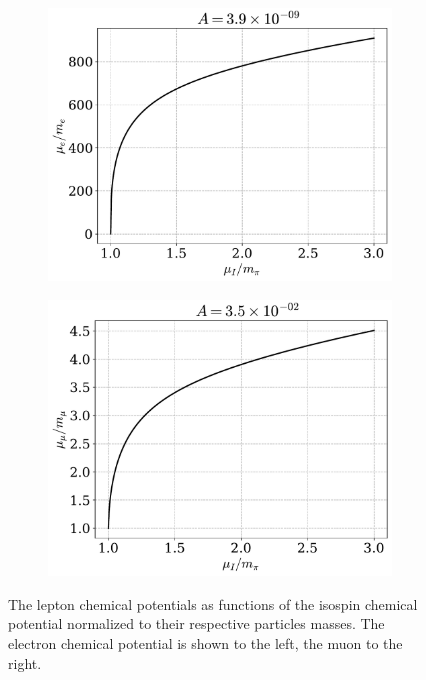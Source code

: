 \begin{figure}[!htb]
    \centering
    \begin{subfigure}{0.49 \textwidth}
        \includegraphics[width=\textwidth]{../scripts/figurer/charge_neutrality/chemical_potential_e.pdf}
    \end{subfigure}
    \begin{subfigure}{0.49\textwidth}
        \includegraphics[width=\textwidth]{../scripts/figurer/charge_neutrality/chemical_potential_mu.pdf}
    \end{subfigure} 
    \caption{
        The lepton chemical potentials as functions of the isospin chemical potential normalized to their respective particles masses.
        The electron chemical potential is shown to the left, the muon to the right.
    } 
    \label{fig: chemical potentials}
\end{figure}


